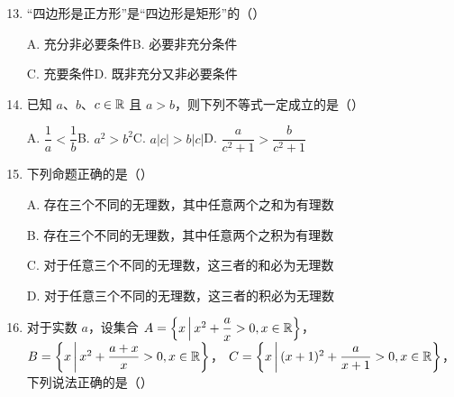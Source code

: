 \documentclass[a4paper,11pt]{article}
\begin{document}

\begin{enumerate}
\setcounter{enumi}{12}

\item “四边形是正方形”是“四边形是矩形”的\mbox{（\quad）}

\keepwithprev
A. 充分非必要条件\qquad\qquad B. 必要非充分条件

C. 充要条件\qquad\qquad\qquad D. 既非充分又非必要条件

\ifanswer
\solbegin
{}
\solend
\fi

\item 已知 $a$、$b$、$c\in\mathbb{R}$ 且 $a>b$，则下列不等式一定成立的是\mbox{（\quad）}%

\keepwithprev
A. $\dfrac1a<\dfrac1b$\qquad\qquad\qquad B. $a^2>b^2$\qquad\qquad C. $a\lvert c\rvert>b\lvert c\rvert$\qquad\qquad D. $\dfrac{a}{c^2+1}>\dfrac{b}{c^2+1}$

\ifanswer
{}
\fi

\item 下列命题正确的是\mbox{（\quad）}

\keepwithprev
A. 存在三个不同的无理数，其中任意两个之和为有理数

B. 存在三个不同的无理数，其中任意两个之积为有理数

C. 对于任意三个不同的无理数，这三者的和必为无理数

D. 对于任意三个不同的无理数，这三者的积必为无理数

\ifanswer
\solbegin
{}
\solend
\fi

\item 对于实数 $a$，设集合 $A=\left\{x\,\middle|\,x^2+\dfrac ax>0,x\in\mathbb{R}\right\}$，$B=\left\{x\,\middle|\,x^2+\dfrac{a+x}{x}>0,x\in\mathbb{R}\right\}$，
$C=\left\{x\,\middle|\,(x+1)^2+\dfrac{a}{x+1}>0,x\in\mathbb{R}\right\}$，下列说法正确的是\mbox{（\quad）}


\end{enumerate}
\end{document}
